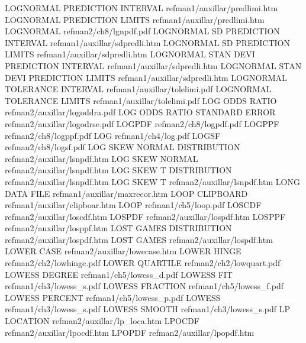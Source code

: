 LOGNORMAL PREDICTION INTERVAL           refman1/auxillar/predlimi.htm
LOGNORMAL PREDICTION LIMITS             refman1/auxillar/predlimi.htm
LOGNORMAL                               refman2/ch8/lgnpdf.pdf
LOGNORMAL SD PREDICTION INTERVAL        refman1/auxillar/sdpredli.htm
LOGNORMAL SD PREDICTION LIMITS          refman1/auxillar/sdpredli.htm
LOGNORMAL STAN DEVI PREDICTION INTERVAL refman1/auxillar/sdpredli.htm
LOGNORMAL STAN DEVI PREDICTION LIMITS   refman1/auxillar/sdpredli.htm
LOGNORMAL TOLERANCE INTERVAL            refman1/auxillar/tolelimi.pdf
LOGNORMAL TOLERANCE LIMITS              refman1/auxillar/tolelimi.pdf
LOG ODDS RATIO                          refman2/auxillar/logoddra.pdf
LOG ODDS RATIO STANDARD ERROR           refman2/auxillar/logodrse.pdf
LOGPDF                                  refman2/ch8/logpdf.pdf
LOGPPF                                  refman2/ch8/logppf.pdf
LOG                                     refman1/ch4/log.pdf
LOGSF                                   refman2/ch8/logsf.pdf
LOG SKEW NORMAL DISTRIBUTION            refman2/auxillar/lsnpdf.htm
LOG SKEW NORMAL                         refman2/auxillar/lsnpdf.htm
LOG SKEW T DISTRIBUTION                 refman2/auxillar/lsnpdf.htm
LOG SKEW T                              refman2/auxillar/lsnpdf.htm
LONG DATA FILE                          refman1/auxillar/maxrecor.htm
LOOP CLIPBOARD                          refman1/auxillar/clipboar.htm
LOOP                                    refman1/ch5/loop.pdf
LOSCDF                                  refman2/auxillar/loscdf.htm
LOSPDF                                  refman2/auxillar/lospdf.htm
LOSPPF                                  refman2/auxillar/losppf.htm
LOST GAMES DISTRIBUTION                 refman2/auxillar/lospdf.htm
LOST GAMES                              refman2/auxillar/lospdf.htm
LOWER CASE                              refman2/auxillar/lowecase.htm
LOWER HINGE                             refman2/ch2/lowhinge.pdf
LOWER QUARTILE                          refman2/ch2/lowquart.pdf
LOWESS DEGREE                           refman1/ch5/lowess_d.pdf
LOWESS FIT                              refman1/ch3/lowess_s.pdf
LOWESS FRACTION                         refman1/ch5/lowess_f.pdf
LOWESS PERCENT                          refman1/ch5/lowess_p.pdf
LOWESS                                  refman1/ch3/lowess_s.pdf
LOWESS SMOOTH                           refman1/ch3/lowess_s.pdf
LP LOCATION                             refman2/auxillar/lp_loca.htm
LPOCDF                                  refman2/auxillar/lpocdf.htm
LPOPDF                                  refman2/auxillar/lpopdf.htm
